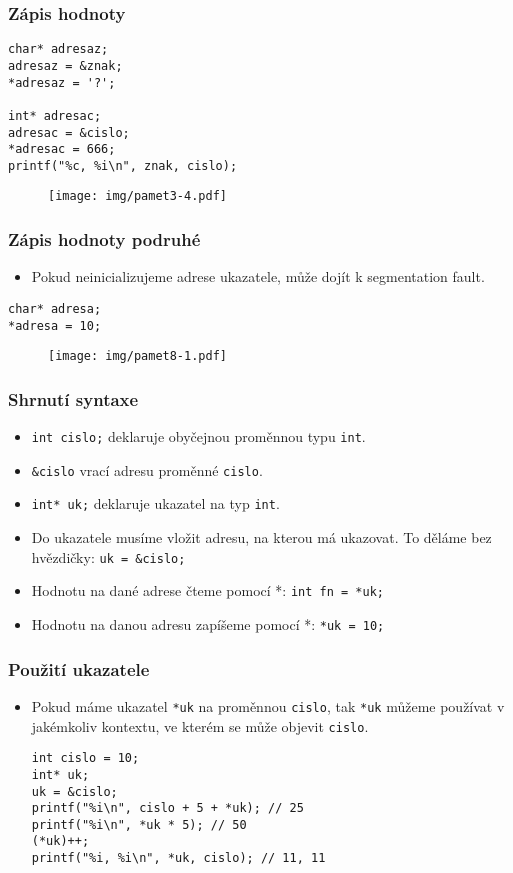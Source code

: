 \documentclass{beamer}
\newenvironment{itemizex}%
  {\large \begin{itemize}%
    \setlength{\itemsep}{8pt}%
    \setlength{\parskip}{8pt}}%
  {\end{itemize}}
\begin{document}
\begin{frame}[t,fragile]\frametitle{Zápis hodnoty} 
\begin{verbatim} 
char* adresaz; 
adresaz = &znak;
*adresaz = '?';

int* adresac; 
adresac = &cislo;
*adresac = 666;
printf("%c, %i\n", znak, cislo);
\end{verbatim}

\begin{figure}[htb]
    \centering
    \texttt{[image: img/pamet3-4.pdf]}
\end{figure}
\end{frame}



\begin{frame}[t,fragile]\frametitle{Zápis hodnoty podruhé} 
\begin{itemizex}
    \item Pokud neinicializujeme adrese ukazatele, může dojít k segmentation fault.
\end{itemizex}
\begin{verbatim} 
char* adresa;
*adresa = 10;
\end{verbatim}

\begin{figure}[htb]
    \centering
    \texttt{[image: img/pamet8-1.pdf]}
\end{figure}
\end{frame}


\begin{frame}[t,fragile]\frametitle{Shrnutí syntaxe} 
    \begin{itemizex}
        \item \texttt{int cislo;} deklaruje obyčejnou proměnnou typu \texttt{int}.
        \item \texttt{\&cislo} vrací adresu proměnné \texttt{cislo}.
        \item \texttt{int* uk;} deklaruje ukazatel na typ \texttt{int}. 
        \item Do ukazatele musíme vložit adresu, na kterou má ukazovat. To děláme bez hvězdičky: \texttt{uk = \&cislo;}
        \item Hodnotu na dané adrese čteme pomocí *: \texttt{int fn = *uk;}
        \item Hodnotu na danou adresu zapíšeme pomocí *: \texttt{*uk = 10;}
    \end{itemizex}
\end{frame}


\begin{frame}[t,fragile]\frametitle{Použití ukazatele} 
\begin{itemizex}
    \item Pokud máme ukazatel \texttt{*uk} na proměnnou \texttt{cislo}, tak \texttt{*uk} můžeme používat v jakémkoliv kontextu, ve kterém se může objevit \texttt{cislo}.
\begin{verbatim} 
int cislo = 10;
int* uk; 
uk = &cislo;
printf("%i\n", cislo + 5 + *uk); // 25
printf("%i\n", *uk * 5); // 50
(*uk)++;
printf("%i, %i\n", *uk, cislo); // 11, 11
\end{verbatim}
\end{itemizex}
\end{frame}
\end{document}
